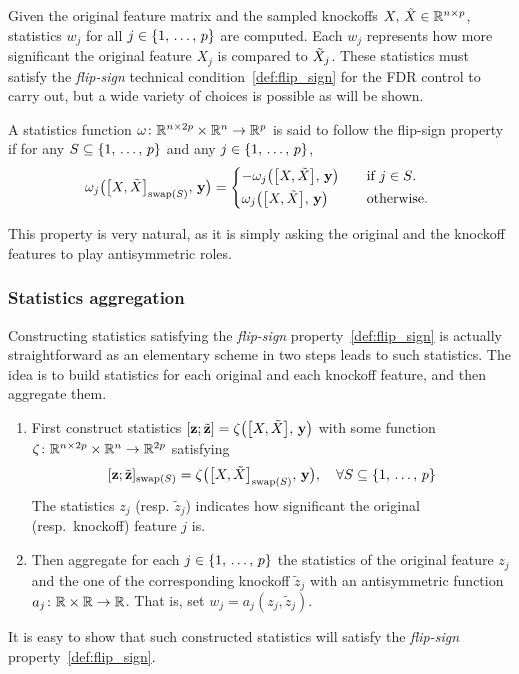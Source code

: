 Given the original feature matrix and the sampled knockoffs $X,\, \tilde{X} \in \mathbb{R}^{n \times p}$,
statistics $w_j$ for all $j \in \left\{ 1,\, \dots,\, p \right\}$ are computed.
Each $w_j$ represents how more significant the original feature $X_j$ is compared to $\tilde{X}_j$.
These statistics must satisfy the \emph{flip-sign} technical condition~\ref{def:flip_sign}
for the FDR control to carry out,
but a wide variety of choices is possible as will be shown.
\begin{definition}\label{def:flip_sign}
A statistics function $\omega \colon \mathbb{R}^{n \times 2p} \times \mathbb{R}^n \to \mathbb{R}^p$
is said to follow the flip-sign property if for any $S \subseteq \left\{ 1,\, \dots,\, p \right\}$ and any $j \in \left\{ 1,\, \dots,\, p \right\}$,
\begin{equation*}
    \omega_j\big( \big[ X, \tX \big]_{\swap(S)},\, \yy \big) = \begin{cases*}
        -\omega_j\big( \big[ X, \tX \big],\, \yy \big) &\quad\text{if $j \in S$.}\\
        \omega_j\big( \big[ X, \tX \big],\, \yy \big) &\quad\text{otherwise.}
    \end{cases*}
\end{equation*}
\end{definition}
This property is very natural,
as it is simply asking the original and the knockoff features to play antisymmetric roles.

\subsubsection{Statistics aggregation}\label{subsubsec:ksa}

Constructing statistics satisfying the \emph{flip-sign} property~\ref{def:flip_sign} is actually straightforward
as an elementary scheme in two steps leads to such statistics.
The idea is to build statistics for each original and each knockoff feature, and then aggregate them.
\begin{enumerate}
    \item First construct statistics $[ \mathbf{z} ; \tilde{\mathbf{z}} ] = \zeta\big( \big[ X, \tilde{X} \big],\, \mathbf{y} \big)$
        with some function $\zeta \colon \mathbb{R}^{n \times 2p} \times \mathbb{R}^n \to \mathbb{R}^{2p}$ satisfying
        \begin{equation}\label{eq:swap_cond}
        [ \mathbf{z} ; \tilde{\mathbf{z}} ]_{\operatorname{swap}(S)} = \zeta\big( \big[ X, \tilde{X} \big]_{\operatorname{swap}(S)},\, \mathbf{y} \big)
        ,\quad
        \forall S \subseteq \left\{ 1,\, \dots,\, p \right\}
        \end{equation}
        The statistics $z_j$ (resp. $\tilde{z}_j$) indicates how significant the original (resp.\ knockoff) feature $j$ is.
    \item Then aggregate for each $j \in \left\{ 1,\, \dots,\, p \right\}$ the statistics of the original feature $z_j$ and the one of the corresponding
        knockoff $\tilde{z}_j$ with an antisymmetric function $a_j \colon \mathbb{R}\times\mathbb{R} \to \mathbb{R}$.
        That is, set $w_j = a_j(z_j, \tilde{z}_j)$.
\end{enumerate}
It is easy to show that such constructed statistics will satisfy the \emph{flip-sign} property~\ref{def:flip_sign}.

